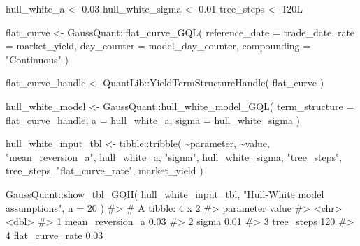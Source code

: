 \documentclass[
  letterpaper,
  DIV=11,
  numbers=noendperiod]{scrreprt}
\newenvironment{Shaded}{\begin{snugshade}}{\end{snugshade}}
\newcommand{\AttributeTok}[1]{\textcolor[rgb]{0.40,0.45,0.13}{#1}}
\newcommand{\CommentTok}[1]{\textcolor[rgb]{0.37,0.37,0.37}{#1}}
\newcommand{\DecValTok}[1]{\textcolor[rgb]{0.68,0.00,0.00}{#1}}
\newcommand{\FloatTok}[1]{\textcolor[rgb]{0.68,0.00,0.00}{#1}}
\newcommand{\FunctionTok}[1]{\textcolor[rgb]{0.28,0.35,0.67}{#1}}
\newcommand{\NormalTok}[1]{\textcolor[rgb]{0.00,0.23,0.31}{#1}}
\newcommand{\OtherTok}[1]{\textcolor[rgb]{0.00,0.23,0.31}{#1}}
\newcommand{\SpecialCharTok}[1]{\textcolor[rgb]{0.37,0.37,0.37}{#1}}
\newcommand{\StringTok}[1]{\textcolor[rgb]{0.13,0.47,0.30}{#1}}
\begin{document}
\begin{Shaded}
\begin{Highlighting}[]
\NormalTok{hull\_white\_a }\OtherTok{\textless{}{-}} \FloatTok{0.03}
\NormalTok{hull\_white\_sigma }\OtherTok{\textless{}{-}} \FloatTok{0.01}
\NormalTok{tree\_steps }\OtherTok{\textless{}{-}} \DecValTok{120}\NormalTok{L}

\NormalTok{flat\_curve }\OtherTok{\textless{}{-}}\NormalTok{ GaussQuant}\SpecialCharTok{::}\FunctionTok{flat\_curve\_GQL}\NormalTok{(}
  \AttributeTok{reference\_date =}\NormalTok{ trade\_date,}
  \AttributeTok{rate =}\NormalTok{ market\_yield,}
  \AttributeTok{day\_counter =}\NormalTok{ model\_day\_counter,}
  \AttributeTok{compounding =} \StringTok{"Continuous"}
\NormalTok{)}

\NormalTok{flat\_curve\_handle }\OtherTok{\textless{}{-}}\NormalTok{ QuantLib}\SpecialCharTok{::}\FunctionTok{YieldTermStructureHandle}\NormalTok{(}
\NormalTok{  flat\_curve}
\NormalTok{)}

\NormalTok{hull\_white\_model }\OtherTok{\textless{}{-}}\NormalTok{ GaussQuant}\SpecialCharTok{::}\FunctionTok{hull\_white\_model\_GQL}\NormalTok{(}
  \AttributeTok{term\_structure =}\NormalTok{ flat\_curve\_handle,}
  \AttributeTok{a =}\NormalTok{ hull\_white\_a,}
  \AttributeTok{sigma =}\NormalTok{ hull\_white\_sigma}
\NormalTok{)}

\NormalTok{hull\_white\_input\_tbl }\OtherTok{\textless{}{-}}\NormalTok{ tibble}\SpecialCharTok{::}\FunctionTok{tribble}\NormalTok{(}
  \SpecialCharTok{\textasciitilde{}}\NormalTok{parameter,          }\SpecialCharTok{\textasciitilde{}}\NormalTok{value,}
  \StringTok{"mean\_reversion\_a"}\NormalTok{,   hull\_white\_a,}
  \StringTok{"sigma"}\NormalTok{,              hull\_white\_sigma,}
  \StringTok{"tree\_steps"}\NormalTok{,         tree\_steps,}
  \StringTok{"flat\_curve\_rate"}\NormalTok{,    market\_yield}
\NormalTok{)}

\NormalTok{GaussQuant}\SpecialCharTok{::}\FunctionTok{show\_tbl\_GQH}\NormalTok{(}
\NormalTok{  hull\_white\_input\_tbl,}
  \StringTok{"Hull{-}White model assumptions"}\NormalTok{,}
  \AttributeTok{n =} \DecValTok{20}
\NormalTok{)}
\CommentTok{\#\textgreater{} \# A tibble: 4 x 2}
\CommentTok{\#\textgreater{}   parameter         value}
\CommentTok{\#\textgreater{}   \textless{}chr\textgreater{}             \textless{}dbl\textgreater{}}
\CommentTok{\#\textgreater{} 1 mean\_reversion\_a   0.03}
\CommentTok{\#\textgreater{} 2 sigma              0.01}
\CommentTok{\#\textgreater{} 3 tree\_steps       120   }
\CommentTok{\#\textgreater{} 4 flat\_curve\_rate    0.03}
\end{Highlighting}
\end{Shaded}
\end{document}
